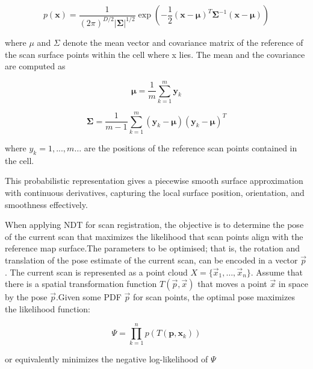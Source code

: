 \begin{equation}
p(\mathbf{x}) = \frac{1}{(2\pi)^{D/2}|\mathbf{\Sigma}|^{1/2}} \exp\left(-\frac{1}{2}(\mathbf{x}-\mathbf{\mu})^T\mathbf{\Sigma}^{-1}(\mathbf{x}-\mathbf{\mu})\right)
\end{equation}

where $\mu$ and $\Sigma$ denote the mean vector and covariance matrix of the reference of the scan surface points within the cell where x lies. The mean and the covariance are computed as 

\begin{equation}
\mathbf{\mu} = \frac{1}{m} \sum_{k=1}^{m} \mathbf{y}_k
\end{equation}

\begin{equation}
\mathbf{\Sigma} = \frac{1}{m - 1} \sum_{k=1}^{m} (\mathbf{y}_k - \mathbf{\mu})(\mathbf{y}_k - \mathbf{\mu})^T
\end{equation}

where $y_k = 1 ,..., m  \ldots$  are the positions of the reference scan points contained in the cell.

This probabilistic representation gives a piecewise smooth surface approximation with continuous derivatives, capturing the local surface position, orientation, and smoothness effectively.

When applying NDT for scan registration, the objective is to determine the pose of the current scan that maximizes the likelihood that scan points align with the reference map surface.The parameters to be optimised; that is, the rotation and translation of the pose estimate of the current scan, can be encoded in a vector $\vec{p}$. The current scan is represented as a point cloud $X = \{\vec{x}_1, \dots, \vec{x}_n\}$. Assume that there is a spatial transformation function $T(\vec{p}, \vec{x})$ that moves a point $\vec{x}$ in space by the pose $\vec{p}$.Given some PDF $\vec{p}$ for scan points, the optimal pose  maximizes the likelihood function:


\begin{equation}
\Psi = \prod_{k=1}^{n} p(T(\mathbf{p}, \mathbf{x}_k))
\end{equation}

or equivalently minimizes the negative log-likelihood of $\Psi$

